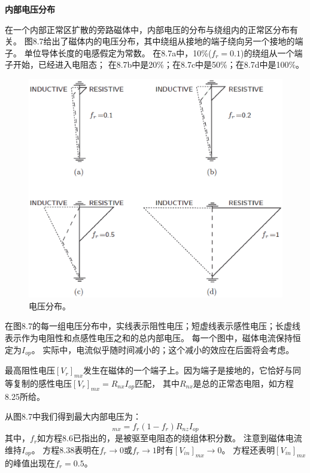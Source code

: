\textbf{内部电压分布}

在一个内部正常区扩散的旁路磁体中，内部电压的分布与绕组内的正常区分布有关。
图8.7给出了磁体内的电压分布，其中绕组从接地的端子绕向另一个接地的端子。
单位导体长度的电感假定为常数。
在8.7a中，10\%($f_r=0.1$)的绕组从一个端子开始，已经进入电阻态；
在8.7b中是20\%；在8.7c中是50\%；在8.7d中是100\%。

\begin{figure}
	\centering
	\includegraphics[scale=0.6]{chpt8/figs/fig8.7.eps}
	\caption{电压分布。}
\end{figure}

在图8.7的每一组电压分布中，实线表示阻性电压；短虚线表示感性电压；长虚线表示作为电阻性和点感性电压之和的总内部电压。
每一个图中，磁体电流保持恒定为$I_{op}$。
实际中，电流似乎随时间减小的；这个减小的效应在后面将会考虑。

最高阻性电压$[V_r]_{mx}$发生在磁体的一个端子上。因为端子是接地的，它恰好与同等复制的感性电压$[V_r]_{mx}=R_{nx}I_{op}$匹配，
其中$R_{nx}$是总的正常态电阻，如方程8.25所给。

从图8.7中我们得到最大内部电压为：
\begin{equation}%
[V_{in}]_{mx}=f_r(1-f_r)R_{nz}I_{op}
\end{equation}
其中，$f_r$如方程8.6已指出的，是被驱至电阻态的绕组体积分数。
注意到磁体电流维持$I_{op}$。
方程8.38表明在$f_r\rightarrow 0$或$f_r\rightarrow 1$时有$[V_{in}]_{mx}\rightarrow 0$。
方程还表明$[V_{in}]_{mx}$的峰值出现在$f_r=0.5$。

